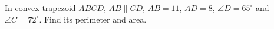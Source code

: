 In convex trapezoid $ABCD$, $AB\parallel CD$, $AB=11$, $AD=8$, $\angle D=65^\circ$ and $\angle C=72^\circ$. Find its perimeter and area.

